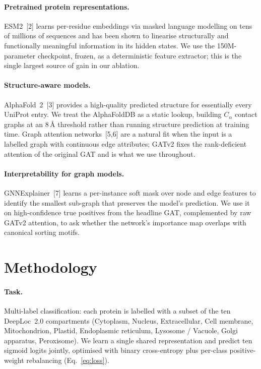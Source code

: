 \documentclass{article}
\begin{document}
\paragraph{Pretrained protein representations.}
ESM2~[2] learns per-residue embeddings via masked language
modelling on tens of millions of sequences and has been shown to
linearise structurally and functionally meaningful information in its
hidden states. We use the 150M-parameter checkpoint, frozen, as a
deterministic feature extractor; this is the single largest source of
gain in our ablation.

\paragraph{Structure-aware models.}
AlphaFold~2~[3] provides a high-quality predicted
structure for essentially every UniProt entry. We treat the AlphaFoldDB
as a static lookup, building $C_\alpha$ contact graphs at an 8\,\AA{}
threshold rather than running structure prediction at training time.
Graph attention networks~[5,6] are a natural
fit when the input is a labelled graph with continuous edge attributes;
GATv2 fixes the rank-deficient attention of the original GAT and is what
we use throughout.

\paragraph{Interpretability for graph models.}
GNNExplainer~[7] learns a per-instance soft mask
over node and edge features to identify the smallest sub-graph that
preserves the model's prediction. We use it on high-confidence true
positives from the headline GAT, complemented by raw GATv2 attention,
to ask whether the network's importance map overlaps with canonical
sorting motifs.

\section{Methodology}\label{sec:method}

\paragraph{Task.}
Multi-label classification: each protein is labelled with a subset of the
ten DeepLoc~2.0 compartments (Cytoplasm, Nucleus, Extracellular, Cell
membrane, Mitochondrion, Plastid, Endoplasmic reticulum, Lysosome /
Vacuole, Golgi apparatus, Peroxisome). We learn a single shared
representation and predict ten sigmoid logits jointly, optimised with
binary cross-entropy plus per-class positive-weight rebalancing
(Eq.~\ref{eq:loss}).
\end{document}
